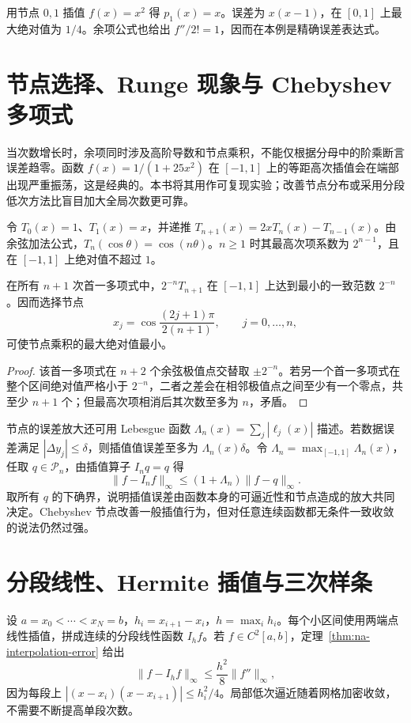 \documentclass[UTF8,12pt,a4paper,fontset=fandol]{ctexbook}
\begin{document}
\begin{example}[二次函数的线性插值]
用节点 $0,1$ 插值 $f(x)=x^2$ 得 $p_1(x)=x$。误差为 $x(x-1)$，在 $[0,1]$ 上最大绝对值为 $1/4$。余项公式也给出 $f''/2!=1$，因而在本例是精确误差表达式。
\end{example}

\section{节点选择、Runge 现象与 Chebyshev 多项式}
\label{sec:na-chebyshev}
当次数增长时，余项同时涉及高阶导数和节点乘积，不能仅根据分母中的阶乘断言误差趋零。函数 $f(x)=1/(1+25x^2)$ 在 $[-1,1]$ 上的等距高次插值会在端部出现严重振荡，这是经典的。本书将其用作可复现实验；改善节点分布或采用分段低次方法比盲目加大全局次数更可靠。

\begin{definition}
令 $T_0(x)=1$、$T_1(x)=x$，并递推 $T_{n+1}(x)=2xT_n(x)-T_{n-1}(x)$。由余弦加法公式，$T_n(\cos\theta)=\cos(n\theta)$。$n\ge1$ 时其最高次项系数为 $2^{n-1}$，且在 $[-1,1]$ 上绝对值不超过 $1$。
\end{definition}

\begin{proposition}[节点乘积的极小性质]
在所有 $n+1$ 次首一多项式中，$2^{-n}T_{n+1}$ 在 $[-1,1]$ 上达到最小的一致范数 $2^{-n}$。因而选择节点
\[
 x_j=\cos\frac{(2j+1)\pi}{2(n+1)},\qquad j=0,\ldots,n,
\]
可使节点乘积的最大绝对值最小。
\end{proposition}
\begin{proof}
该首一多项式在 $n+2$ 个余弦极值点交替取 $\pm2^{-n}$。若另一个首一多项式在整个区间绝对值严格小于 $2^{-n}$，二者之差会在相邻极值点之间至少有一个零点，共至少 $n+1$ 个；但最高次项相消后其次数至多为 $n$，矛盾。
\end{proof}

节点的误差放大还可用 Lebesgue 函数 $\Lambda_n(x)=\sum_j|\ell_j(x)|$ 描述。若数据误差满足 $|\Delta y_j|\le\delta$，则插值值误差至多为 $\Lambda_n(x)\delta$。令 $\Lambda_n=\max_{[-1,1]}\Lambda_n(x)$，任取 $q\in\mathcal P_n$，由插值算子 $I_nq=q$ 得
\[
 \|f-I_nf\|_\infty\le(1+\Lambda_n)\|f-q\|_\infty.
\]
取所有 $q$ 的下确界，说明插值误差由函数本身的可逼近性和节点造成的放大共同决定。Chebyshev 节点改善一般插值行为，但对任意连续函数都无条件一致收敛的说法仍然过强。

\section{分段线性、Hermite 插值与三次样条}
设 $a=x_0<\cdots<x_N=b$，$h_i=x_{i+1}-x_i$，$h=\max_i h_i$。每个小区间使用两端点线性插值，拼成连续的分段线性函数 $I_hf$。若 $f\in C^2[a,b]$，定理~\ref{thm:na-interpolation-error} 给出
\[
 \|f-I_hf\|_\infty\le\frac{h^2}{8}\|f''\|_\infty,
\]
因为每段上 $|(x-x_i)(x-x_{i+1})|\le h_i^2/4$。局部低次逼近随着网格加密收敛，不需要不断提高单段次数。
\end{document}
